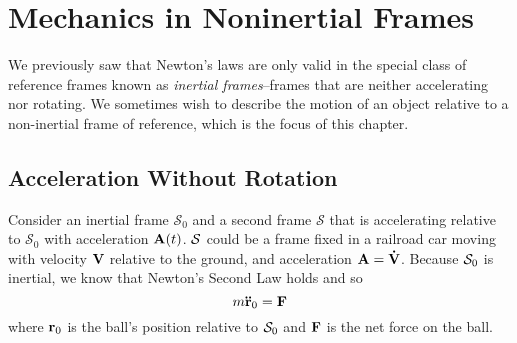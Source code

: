 \chapter{Mechanics in Noninertial Frames}
We previously saw that Newton's laws are only valid in the special class of reference frames known as \textit{inertial frames}--frames that are neither accelerating nor rotating. We sometimes wish to describe the motion of an object relative to a non-inertial frame of reference, which is the focus of this chapter.
\section{Acceleration Without Rotation}
Consider an inertial frame $\mathcal S_0$ and a second frame $\mathcal S$ that is accelerating relative to $\mathcal S_0$ with acceleration $\mathbf{A}(t)$. $\mathcal{S}$ could be a frame fixed in a railroad car moving with velocity $\mathbf{V}$ relative to the ground, and acceleration $\mathbf{A} = \mathbf{\dot V}$. Because $\mathcal{S}_0$ is inertial, we know that Newton's Second Law holds and so
\[ m\mathbf{\ddot r}_0 = \mathbf{F}\]
where $\mathbf{r}_0$ is the ball's position relative to $\mathcal{S}_0$ and $\mathbf{F}$ is the net force on the ball. 

